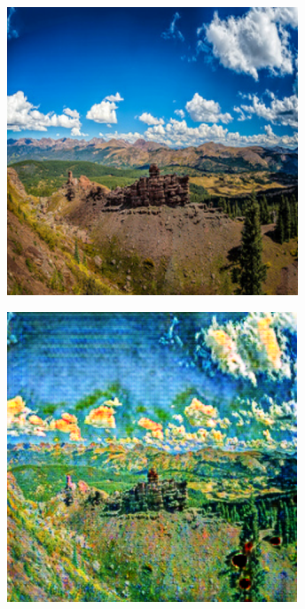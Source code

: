 \begin{figure}
\begin{subfigure}[t]{.14\textwidth}
  \end{subfigure}
  \hfill
  \begin{subfigure}[t]{.14\textwidth}
    \centering
    \includegraphics[width=\linewidth]{images/cycleGanResults/photo_input2.png}
  \end{subfigure}
  \begin{subfigure}[t]{.14\textwidth}
    \centering
    \includegraphics[width=\linewidth]{images/cycleGanResults/photo_output2.png}

\end{subfigure}
\end{figure}
